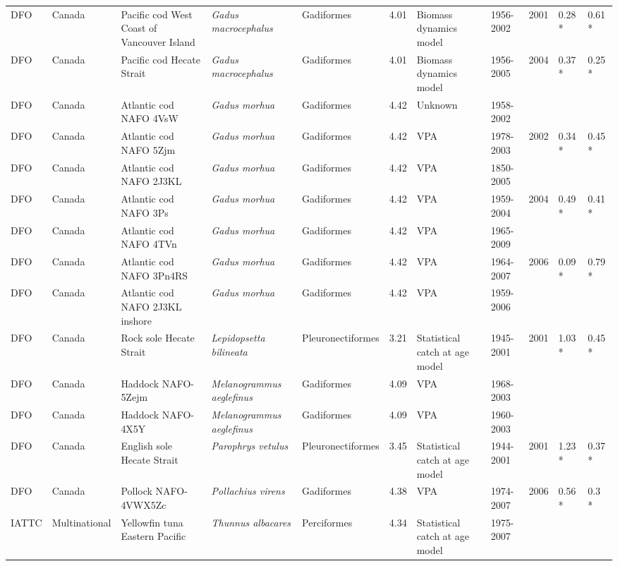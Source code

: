 \begin{longtable}{p{1.5cm}p{1.5cm}p{3cm}p{3cm}p{2.5cm}p{0.9cm}p{1.4cm}p{0.9cm}p{0.9cm}p{0.9cm}p{1cm}}
  DFO & Canada & Pacific cod West Coast of Vancouver Island & \textit{Gadus macrocephalus} & Gadiformes & 4.01 & Biomass dynamics model & 1956-2002 & 2001 & 0.28 * & 0.61 * \\ 
  DFO & Canada & Pacific cod Hecate Strait & \textit{Gadus macrocephalus} & Gadiformes & 4.01 & Biomass dynamics model & 1956-2005 & 2004 & 0.37 * & 0.25 * \\ 
  DFO & Canada & Atlantic cod NAFO 4VsW & \textit{Gadus morhua} & Gadiformes & 4.42 & Unknown & 1958-2002 &  &  &  \\ 
  DFO & Canada & Atlantic cod NAFO 5Zjm & \textit{Gadus morhua} & Gadiformes & 4.42 & VPA & 1978-2003 & 2002 & 0.34 * & 0.45 * \\ 
  DFO & Canada & Atlantic cod NAFO 2J3KL & \textit{Gadus morhua} & Gadiformes & 4.42 & VPA & 1850-2005 &  &  &  \\ 
  DFO & Canada & Atlantic cod NAFO 3Ps & \textit{Gadus morhua} & Gadiformes & 4.42 & VPA & 1959-2004 & 2004 & 0.49 * & 0.41 * \\ 
  DFO & Canada & Atlantic cod NAFO 4TVn & \textit{Gadus morhua} & Gadiformes & 4.42 & VPA & 1965-2009 &  &  &  \\ 
  DFO & Canada & Atlantic cod NAFO 3Pn4RS & \textit{Gadus morhua} & Gadiformes & 4.42 & VPA & 1964-2007 & 2006 & 0.09 * & 0.79 * \\ 
  DFO & Canada & Atlantic cod NAFO 2J3KL inshore & \textit{Gadus morhua} & Gadiformes & 4.42 & VPA & 1959-2006 &  &  &  \\ 
  DFO & Canada & Rock sole Hecate Strait & \textit{Lepidopsetta bilineata} & Pleuronectiformes & 3.21 & Statistical catch at age model & 1945-2001 & 2001 & 1.03 * & 0.45 * \\ 
  DFO & Canada & Haddock NAFO-5Zejm & \textit{Melanogrammus aeglefinus} & Gadiformes & 4.09 & VPA & 1968-2003 &  &  &  \\ 
  DFO & Canada & Haddock NAFO-4X5Y & \textit{Melanogrammus aeglefinus} & Gadiformes & 4.09 & VPA & 1960-2003 &  &  &  \\ 
  DFO & Canada & English sole Hecate Strait & \textit{Parophrys vetulus} & Pleuronectiformes & 3.45 & Statistical catch at age model & 1944-2001 & 2001 & 1.23 * & 0.37 * \\ 
  DFO & Canada & Pollock NAFO-4VWX5Zc & \textit{Pollachius virens} & Gadiformes & 4.38 & VPA & 1974-2007 & 2006 & 0.56 * & 0.3 * \\ 
  IATTC & Multinational & Yellowfin tuna Eastern Pacific & \textit{Thunnus albacares} & Perciformes & 4.34 & Statistical catch at age model & 1975-2007 &  &  &  \\ 

\end{longtable}
